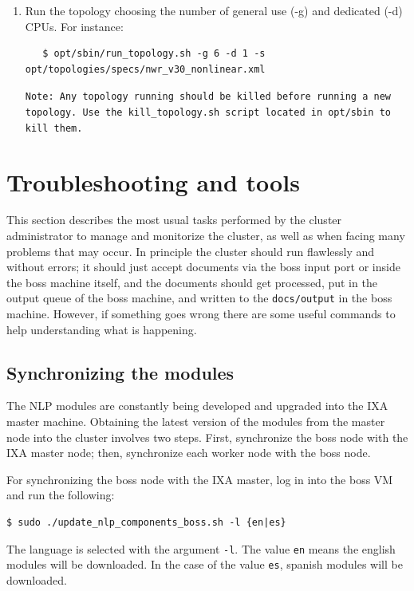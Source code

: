 \documentclass[a4]{article}
\begin{document}
\begin{enumerate}
\item Run the topology choosing the number of general use (-g) and
  dedicated (-d) CPUs. For instance:

\begin{verbatim}
   $ opt/sbin/run_topology.sh -g 6 -d 1 -s opt/topologies/specs/nwr_v30_nonlinear.xml
\end{verbatim}

  \texttt{Note: Any topology running should be killed before running a
    new topology. Use the kill\_topology.sh script located in opt/sbin
    to kill them.}
\end{enumerate}


\section{Troubleshooting and tools}
\label{sec:troubl-tools}

This section describes the most usual tasks performed by the cluster
administrator to manage and monitorize the cluster, as well as when facing
many problems that may occur. In principle the cluster should run flawlessly
and without errors; it should just accept documents via the boss input port
or inside the boss machine itself, and the documents should get processed,
put in the output queue of the boss machine, and written to the
\texttt{docs/output} in the boss machine. However, if something goes wrong
there are some useful commands to help understanding what is happening.



\subsection{Synchronizing the modules}
\label{sec:synchr-modul}

The NLP modules are constantly being developed and upgraded into the IXA
master machine. Obtaining the latest version of the modules from the master
node into the cluster involves two steps. First, synchronize the boss node
with the IXA master node; then, synchronize each worker node with the boss
node.

For synchronizing the boss node with the IXA master, log in into the boss VM
and run the following:

\begin{verbatim}
$ sudo ./update_nlp_components_boss.sh -l {en|es}
\end{verbatim}

The language is selected with the argument \texttt{-l}. The value \texttt{en} means the english modules will be downloaded. In the case of the value \texttt{es}, spanish modules will be downloaded.
\end{document}
